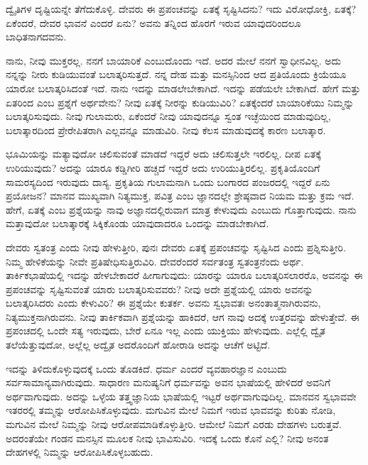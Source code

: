 ದ್ವೈತಿಗಳ ದೃಷ್ಟಿಯನ್ನೇ ತೆಗೆದುಕೊಳ್ಳಿ. ದೇವರು ಈ ಪ್ರಪಂಚವನ್ನು ಏತಕ್ಕೆ ಸೃಷ್ಟಿಸಿದನು? ಇದು ವಿರೋಧೋಕ್ತಿ, ಏತಕ್ಕೆ? ಏಕೆಂದರೆ, ದೇವರ ಭಾವನೆ ಎಂದರೆ ಏನು? ಅವನು ತನ್ನಿಂದ ಹೊರಗೆ ಇರುವ ಯಾವುದರಿಂದಲೂ ಬಾಧಿತನಾಗದವನು.

ನಾನು, ನೀವು ಮುಕ್ತರಲ್ಲ. ನನಗೆ ಬಾಯಾರಿಕೆ ಎಂಬುದೊಂದು ಇದೆ. ಅದರ ಮೇಲೆ ನನಗೆ ಸ್ವಾಧೀನವಿಲ್ಲ. ಅದು ನನ್ನನ್ನು ನೀರು ಕುಡಿಯುವಂತೆ ಬಲಾತ್ಕರಿಸುತ್ತದೆ. ನನ್ನ ದೇಹ ಮತ್ತು ಮನಸ್ಸಿನಿಂದ ಆದ ಪ್ರತಿಯೊಂದು ಕ್ರಿಯೆಯೂ ಯಾರೋ ಬಲಾತ್ಕರಿಸಿದಂತೆ ಇದೆ. ನಾನು ಇದನ್ನು ಮಾಡಲೇಬೇಕಾಗಿದೆ. ಇದನ್ನು ಪಡೆಯಲೇ ಬೇಕಾಗಿದೆ. ಹೇಗೆ ಮತ್ತು ಏತರಿಂದ ಎಂಬ ಪ್ರಶ್ನೆಗೆ ಅರ್ಥವೇನು? ನೀವು ಏತಕ್ಕೆ ನೀರನ್ನು ಕುಡಿಯುವಿರಿ? ಏತಕ್ಕೆಂದರೆ ಬಾಯಾರಿಕೆಯು ನಿಮ್ಮನ್ನು ಬಲಾತ್ಕರಿಸುವುದು. ನೀವು ಗುಲಾಮರು, ಏಕೆಂದರೆ ನೀವು ಯಾವುದನ್ನೂ ಸ್ವಂತ ಇಚ್ಛೆಯಿಂದ ಮಾಡುವುದಿಲ್ಲ, ಬಲಾತ್ಕಾರದಿಂದ ಪ್ರೇರೇಪಿತರಾಗಿ ಎಲ್ಲವನ್ನೂ ಮಾಡುವಿರಿ. ನೀವು ಕೆಲಸ ಮಾಡುವುದಕ್ಕೆ ಕಾರಣ ಬಲಾತ್ಕಾರ.

ಭೂಮಿಯನ್ನು ಮತ್ಯಾವುದೋ ಚಲಿಸುವಂತೆ ಮಾಡದೆ ಇದ್ದರೆ ಅದು ಚಲಿಸುತ್ತಲೇ ಇರಲಿಲ್ಲ. ದೀಪ ಏತಕ್ಕೆ ಉರಿಯುವುದು? ಅದನ್ನು ಯಾರೂ ಕಡ್ಡಿಗೀರಿ ಹಚ್ಚದೆ ಇದ್ದರೆ ಅದು ಉರಿಯುತ್ತಿರಲಿಲ್ಲ. ಪ್ರಕೃತಿಯೊಂದಿಗೆ ಸಾಮರಸ್ಯದಿಂದ ಇರುವುದು ದಾಸ್ಯ. ಪ್ರಕೃತಿಯ ಗುಲಾಮನಾಗಿ ಒಂದು ಬಂಗಾರದ ಪಂಜರದಲ್ಲಿ ಇದ್ದರೆ ಏನು ಪ್ರಯೋಜನ? ಮಾನವ ಮುಖ್ಯವಾಗಿ ನಿತ್ಯಮುಕ್ತ, ಪವಿತ್ರ ಎಂಬ ಜ್ಞಾನದಲ್ಲೇ ಶ್ರೇಷ್ಠವಾದ ನಿಯಮ ಮತ್ತು ಕ್ರಮ ಇದೆ. ಹೇಗೆ, ಏತಕ್ಕೆ ಎಂಬ ಪ್ರಶ್ನೆಯನ್ನು ನಾವು ಅಜ್ಞಾನದಲ್ಲಿರುವಾಗ ಮಾತ್ರ ಕೇಳುವುದು ಎಂಬುದು ಗೊತ್ತಾಗುವುದು. ನಾನು ಮತ್ತಾವುದೋ ಬಲಾತ್ಕಾರಕ್ಕೆ ಸಿಕ್ಕಿಕೊಂಡು ಯಾವುದಾದರೂ ಒಂದನ್ನು ಮಾಡಬೇಕಾಗಿದೆ.

ದೇವರು ಸ್ವತಂತ್ರ ಎಂದು ನೀವು ಹೇಳುತ್ತೀರಿ, ಪುನಃ ದೇವರು ಏತಕ್ಕೆ ಪ್ರಪಂಚವನ್ನು ಸೃಷ್ಟಿಸಿದ ಎಂದು ಪ್ರಶ್ನಿಸುತ್ತೀರಿ. ನಿಮ್ಮ ಹೇಳಿಕೆಯನ್ನು ನೀವೇ ಪ್ರತಿಷೇಧಿಸುತ್ತಿರುವಿರಿ. ದೇವರೆಂದರೆ ಸರ್ವತಂತ್ರ ಸ್ವತಂತ್ರನೆಂದು ಅರ್ಥ. ತಾರ್ಕಿಕಭಾಷೆಯಲ್ಲಿ ಇದನ್ನು ಹೇಳಬೇಕಾದರೆ ಹೀಗಾಗುವುದು: ಯಾರನ್ನು ಯಾರೂ ಬಲಾತ್ಕರಿಸಲಾರರೊ, ಅವನನ್ನು ಈ ಪ್ರಪಂಚವನ್ನು ಸೃಷ್ಟಿಸುವಂತೆ ಯಾರು ಬಲಾತ್ಕರಿಸುವವರು? ನೀವು ಅದೇ ಪ್ರಶ್ನೆಯಲ್ಲಿ ಯಾರು ಅವನನ್ನು ಬಲಾತ್ಕರಿಸಿದರು ಎಂದು ಕೇಳುವಿರಿ? ಈ ಪ್ರಶ್ನೆಯೇ ಕುತರ್ಕ. ಅವನು ಸ್ವಭಾವತಃ ಅನಂತಾತ್ಮನಾಗಿರುವನು, ನಿತ್ಯಮುಕ್ತನಾಗಿರುವನು. ನೀವು ತಾರ್ಕಿಕವಾಗಿ ಪ್ರಶ್ನೆಯನ್ನು ಹಾಕಿದರೆ, ಆಗ ನಾವು ಅದಕ್ಕೆ ಉತ್ತರವನ್ನು ಹೇಳುತ್ತೇವೆ. ಈ ಪ್ರಪಂಚದಲ್ಲಿ ಒಂದೇ ಸತ್ಯ ಇರುವುದು, ಬೇರೆ ಏನೂ ಇಲ್ಲ ಎಂದು ಯುಕ್ತಿಯು ಹೇಳುವುದು. ಎಲ್ಲೆಲ್ಲಿ ದ್ವೈತ ತಲೆಯೆತ್ತುವುದೋ, ಅಲ್ಲೆಲ್ಲ ಅದ್ವೈತ ಅದರೊಂದಿಗೆ ಹೋರಾಡಿ ಅದನ್ನು ಆಚೆಗೆ ಅಟ್ಟಿದೆ.

ಇದನ್ನು ತಿಳಿದುಕೊಳ್ಳುವುದಕ್ಕೆ ಒಂದು ತೊಡಕಿದೆ. ಧರ್ಮ ಎಂದರೆ ವ್ಯವಹಾರಜ್ಞಾನ ಎಂಬುದು ಸರ್ವಸಾಮಾನ್ಯವಾಗಿರುವುದು. ಸಾಧಾರಣ ಮನುಷ್ಯನಿಗೆ ಧರ್ಮವನ್ನು ಅವನ ಭಾಷೆಯಲ್ಲಿ ಹೇಳಿದರೆ ಅವನಿಗೆ ಅರ್ಥವಾಗುವುದು. ಅದನ್ನು ಒಳ್ಳೆಯ ತತ್ತ್ವಜ್ಞಾನಿಯ ಭಾಷೆಯಲ್ಲಿ ಇಟ್ಟರೆ ಅರ್ಥವಾಗುವುದಿಲ್ಲ. ಮಾನವನ ಸ್ವಭಾವವೇ ಇತರರಲ್ಲಿ ತಮ್ಮನ್ನು ಆರೋಪಿಸಿಕೊಳ್ಳುವುದು. ಮಗುವಿನ ಮೇಲೆ ನಿಮಗೆ ಇರುವ ಭಾವವನ್ನು ಕುರಿತು ನೋಡಿ, ಮಗುವಿನ ಮೇಲೆ ನಿಮ್ಮನ್ನು ನೀವು ಆರೋಪಮಾಡಿಕೊಳ್ಳುತ್ತೀರಿ. ಆಮೇಲೆ ನಿಮಗೆ ಎರಡು ದೇಹಗಳು ಬರುತ್ತವೆ. ಅದರಂತೆಯೇ ಗಂಡನ ಮನಸ್ಸಿನ ಮೂಲಕ ನೀವು ಭಾವಿಸುವಿರಿ. ಇದಕ್ಕೆ ಒಂದು ಕೊನೆ ಎಲ್ಲಿ? ನೀವು ಅನಂತ ದೇಹಗಳಲ್ಲಿ ನಿಮ್ಮನ್ನು ಆರೋಪಿಸಿಕೊಳ್ಳಬಹುದು.

